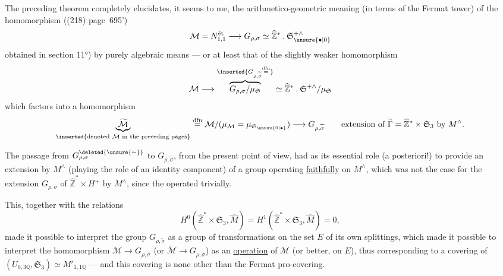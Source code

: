 


 The preceding theorem completely elucidates, it seems to me, the arithmetico-geometric meaning (in terms of the Fermat tower) of the homomorphism ((218) page~695')
\[
\mathcal M=N_{1,1}^{\text{ét}}\longrightarrow G_{\rho,\sigma}\simeq\widehat{\mathbb Z}^{*}\mathbin{.}\mathfrak S_{\unsure{\bullet|0}}^{+\wedge}
\]
obtained in section 11°) by purely algebraic means --- or at least that of the slightly weaker homomorphism
\[
\mathcal M\longrightarrow\overbrace{G_{\rho,\sigma}/\mu_{\mathfrak S}}^{\inserted{G_{\rho,\widetilde{\sigma}}\overset{\mathrm{dfn}}{=}}}\simeq\widehat{\mathbb Z}^{*}\mathbin{.}\mathfrak S^{+\wedge}/\mu_{\mathfrak S}
\]
which factors  into a homomorphism
\[
\underbrace{\widetilde{\mathcal M}}_{\inserted{\text{denoted }\mathcal M\text{ in the preceding pages}}}\overset{\mathrm{dfn}}{=}\mathcal M/(\mu_{\mathcal M}=\mu_{\mathfrak S_{\unsure{0|\bullet}}})\longrightarrow G_{\rho,\widetilde{\sigma}}
\qquad\text{extension of }\widetilde\Gamma=\widehat{\mathbb Z}^{*}\times\mathfrak S_3\text{ by }M^\wedge.
\]

The passage from $G_{\rho,\sigma}^{\deleted{\unsure{\sim}}}$ to $G_{\rho,\widetilde{\sigma}}$, from the present point of view, had as its essential role (a posteriori!) to provide an extension by $M^\wedge$ (playing the role of an identity component) of a group operating \uline{faithfully} on $M^\wedge$, which was not the case for the extension $G_{\rho,\sigma}$ of $\widehat{\mathbb Z}^{*}\times H^+$ by $M^\wedge$, since the   operated trivially.



This, together with the relations
\[
H^0(\widehat{\mathbb Z}^{*}\times\mathfrak S_3,\widehat M)=H^1(\widehat{\mathbb Z}^{*}\times\mathfrak S_3,\widehat M)=0,
\]
made it possible to interpret the group $G_{\rho,\widetilde\sigma}$ as a group of transformations on the set $E$ of its own splittings, which made it possible to interpret the homomorphism $\mathcal M\to G_{\rho,\widetilde\sigma}$ (or $\widetilde{\mathcal M}\to G_{\rho,\widetilde\sigma}$) as an  \uline{operation} of $\mathcal M$  (or better,  on $E$), thus corresponding to a  covering of $(U_{0,3\mathbb Q},\mathfrak S_3)\simeq M'_{1,1\mathbb Q}$ --- and this covering is none other than the Fermat pro-covering.

